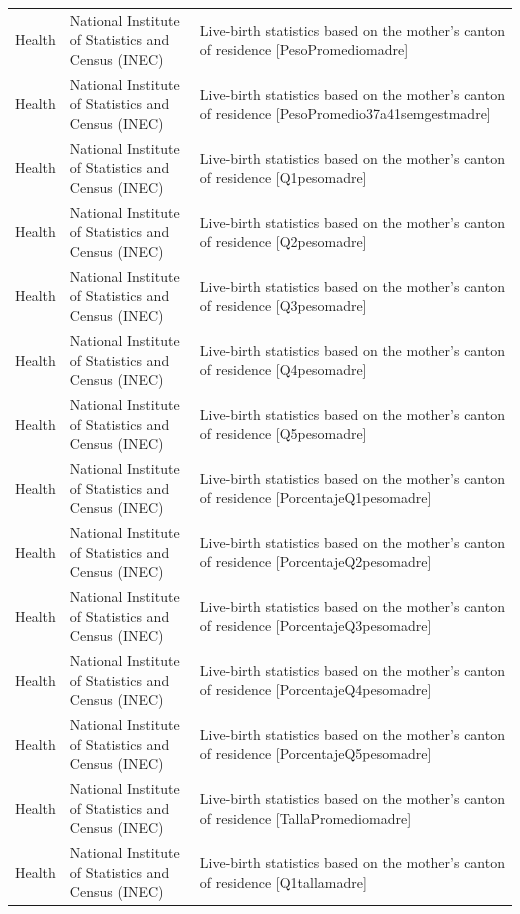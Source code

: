 \begin{landscape}
\begin{longtable}[t]{>{\raggedright\arraybackslash}p{3.4cm}>{\raggedright\arraybackslash}p{5.6cm}>{\raggedright\arraybackslash}p{12.4cm}}
Health & National Institute of Statistics and Census (INEC) & Live-birth statistics based on the mother's canton of residence [PesoPromediomadre]\\
Health & National Institute of Statistics and Census (INEC) & Live-birth statistics based on the mother's canton of residence [PesoPromedio37a41semge\allowbreak{}stmadre]\\
Health & National Institute of Statistics and Census (INEC) & Live-birth statistics based on the mother's canton of residence [Q1pesomadre]\\
Health & National Institute of Statistics and Census (INEC) & Live-birth statistics based on the mother's canton of residence [Q2pesomadre]\\
Health & National Institute of Statistics and Census (INEC) & Live-birth statistics based on the mother's canton of residence [Q3pesomadre]\\
Health & National Institute of Statistics and Census (INEC) & Live-birth statistics based on the mother's canton of residence [Q4pesomadre]\\
Health & National Institute of Statistics and Census (INEC) & Live-birth statistics based on the mother's canton of residence [Q5pesomadre]\\
Health & National Institute of Statistics and Census (INEC) & Live-birth statistics based on the mother's canton of residence [PorcentajeQ1pesomadre]\\
Health & National Institute of Statistics and Census (INEC) & Live-birth statistics based on the mother's canton of residence [PorcentajeQ2pesomadre]\\
Health & National Institute of Statistics and Census (INEC) & Live-birth statistics based on the mother's canton of residence [PorcentajeQ3pesomadre]\\
Health & National Institute of Statistics and Census (INEC) & Live-birth statistics based on the mother's canton of residence [PorcentajeQ4pesomadre]\\
Health & National Institute of Statistics and Census (INEC) & Live-birth statistics based on the mother's canton of residence [PorcentajeQ5pesomadre]\\
Health & National Institute of Statistics and Census (INEC) & Live-birth statistics based on the mother's canton of residence [TallaPromediomadre]\\
Health & National Institute of Statistics and Census (INEC) & Live-birth statistics based on the mother's canton of residence [Q1tallamadre]\\

\end{longtable}
\end{landscape}
